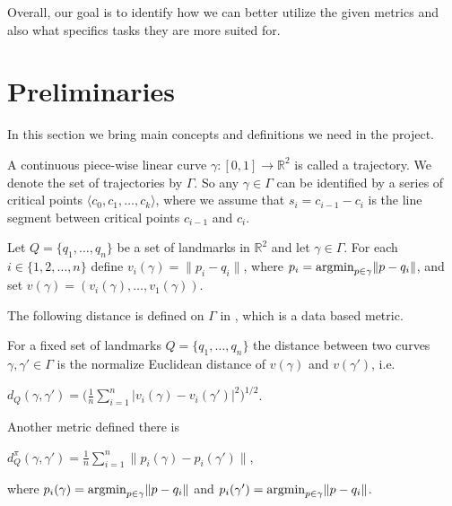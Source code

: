 \documentclass[11pt,a4paper,twocolumn]{article}%
\begin{document}
Overall, our goal is to identify how we can better utilize the given metrics and also what specifics tasks they are more suited for.

\fi
\section{Preliminaries}

In this section we bring main concepts and definitions we need in the project. 

A continuous piece-wise linear curve $\gamma: [0,1] \to \mathbb{R}^2$ is called a trajectory. We denote the set of trajectories by $\Gamma$. So any $\gamma \in \Gamma$ can be identified by a series of critical points $\langle c_0, c_1,\ldots, c_k \rangle$, where we assume that $s_i = c_{i-1} -c_i$ is the line segment between critical points $c_{i-1}$ and $c_i$. 
\iffalse
We assume that Each critical point $c_i$ is $\tau$-separated, that is the ball $B(c_i, \tau)$ only intersects the two adjacent segments $s_{i-1}$ and $s_i$ of any $\gamma \in \Gamma$ and also $s_i$'s have at most 3 points in common. 
\fi

Let $Q=\{q_1, \ldots, q_n\}$ be a set of landmarks in $\mathbb{R}^2$ and let $\gamma\in \Gamma$. For each $i\in \{1,2, \ldots,n\}$ define $v_i(\gamma) = \|p_i - q_i\|$, where $p_i = {\rm argmin}_{p \in \gamma} \|p-q_i\|$, and set $v(\gamma) = (v_i(\gamma), \ldots, v_1(\gamma))$.

The following distance is defined on $\Gamma$ in \citep{phillips2018simple}, which is a data based metric.

For a fixed set of landmarks $Q=\{q_1, \ldots, q_n\}$ the distance between two curves $\gamma, \gamma' \in \Gamma$ is the normalize Euclidean distance of $v(\gamma)$ and $v(\gamma')$, i.e. 

$d_Q(\gamma, \gamma') = \Big(\frac{1}{n} \sum_{i=1}^n |v_i(\gamma) - v_i(\gamma')|^2 \Big)^{1/2}$.

Another metric defined there is 

$d_Q^{\pi}(\gamma, \gamma') = \frac{1}{n} \sum_{i=1}^n \|p_i(\gamma) - p_i(\gamma')\|$,

where $p_i(\gamma) = {\rm argmin}_{p \in \gamma} \|p-q_i\|$ and $p_i(\gamma') = {\rm argmin}_{p \in \gamma} \|p-q_i\|$.  
\end{document}
